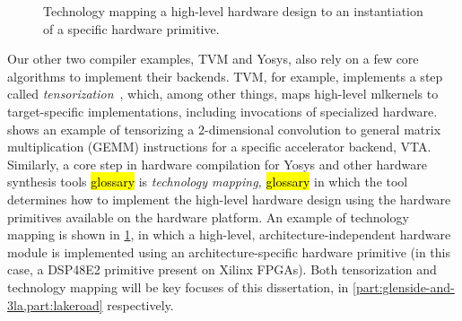 \begin{figure}[]
\centering
{}
\caption{Technology mapping a high-level
  hardware design
  to an instantiation of a specific 
  hardware primitive.}
\label{fig:intro:techmapping}
\end{figure}


Our other two compiler examples,
  TVM and Yosys,
  also rely on a few core algorithms
  to implement their backends.
TVM, for example, implements a step
  called 
  \textit{tensorization}~\cite{tvmtensorization},
  which, among other things, maps high-level 
  \glspl{mlkernel}
  to target-specific implementations,
  including invocations
  of specialized hardware.
  shows an example of tensorizing 
  a 2-dimensional convolution
  to general matrix multiplication (GEMM) instructions
  for a specific accelerator backend, VTA.
Similarly,
  a core step in hardware compilation
  for
  Yosys and other hardware synthesis tools \hl{glossary}
  is \textit{technology mapping,} \hl{glossary}
  in which the tool determines
  how to implement the high-level
  hardware design
  using the hardware primitives
  available on the hardware
  platform.
An example of technology mapping is shown in
  \cref{fig:intro:techmapping},
  in which a high-level, architecture-independent
  hardware module 
  is implemented using an
  architecture-specific hardware primitive
  (in this case, a DSP48E2 primitive
    present on Xilinx FPGAs).
Both tensorization
  and technology mapping
  will be key focuses of this dissertation,
  in \cref{part:glenside-and-3la,part:lakeroad}
  respectively.

